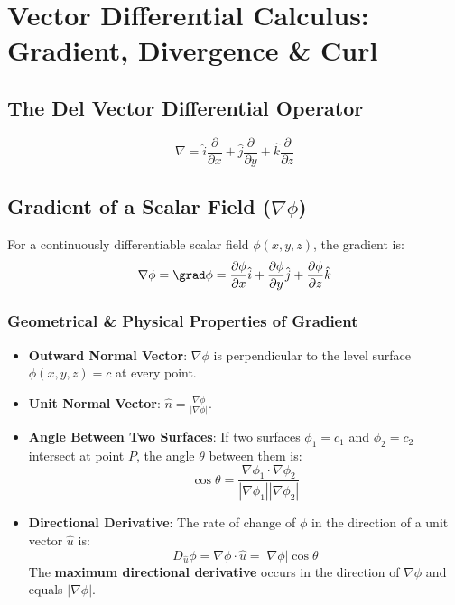 \section{Vector Differential Calculus: Gradient, Divergence \& Curl}

\subsection{The Del Vector Differential Operator}
\begin{equation}
    \nabla = \hat{i}\frac{\partial}{\partial x} + \hat{j}\frac{\partial}{\partial y} + \hat{k}\frac{\partial}{\partial z}
\end{equation}

\subsection{Gradient of a Scalar Field ($\nabla\phi$)}

\begin{definition}[Gradient]
For a continuously differentiable scalar field $\phi(x,y,z)$, the gradient is:
\begin{equation}
    \nabla\phi = \grad\phi = \frac{\partial\phi}{\partial x}\hat{i} + \frac{\partial\phi}{\partial y}\hat{j} + \frac{\partial\phi}{\partial z}\hat{k}
\end{equation}
\end{definition}

\subsubsection{Geometrical \& Physical Properties of Gradient}
\begin{itemize}[leftmargin=1.5em]
    \item \textbf{Outward Normal Vector}: $\nabla\phi$ is perpendicular to the level surface $\phi(x,y,z) = c$ at every point.
    \item \textbf{Unit Normal Vector}: $\hat{n} = \frac{\nabla\phi}{|\nabla\phi|}$.
    \item \textbf{Angle Between Two Surfaces}: If two surfaces $\phi_1 = c_1$ and $\phi_2 = c_2$ intersect at point $P$, the angle $\theta$ between them is:
    \begin{equation}
        \cos\theta = \frac{\nabla\phi_1 \cdot \nabla\phi_2}{|\nabla\phi_1| |\nabla\phi_2|}
    \end{equation}
    \item \textbf{Directional Derivative}: The rate of change of $\phi$ in the direction of a unit vector $\hat{u}$ is:
    \begin{equation}
        D_{\hat{u}}\phi = \nabla\phi \cdot \hat{u} = |\nabla\phi| \cos\theta
    \end{equation}
    The \textbf{maximum directional derivative} occurs in the direction of $\nabla\phi$ and equals $|\nabla\phi|$.
\end{itemize}

